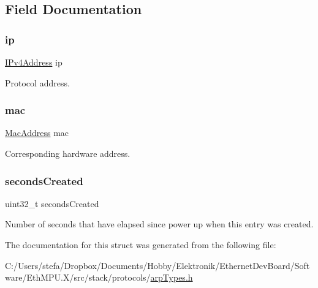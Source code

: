 \subsection{Field Documentation}
\mbox{\label{struct_a_r_p_table_entry__t_a9eb6364cfba6d26a96b3caa542fd9ed9}} 
\subsubsection{\texorpdfstring{ip}{ip}}
{\footnotesize\ttfamily \mbox{\hyperlink{group__ipv4_gaea6452a06c6a1edb025bdd2a70fef14c}{I\+Pv4\+Address}} ip}



Protocol address. 

\mbox{\label{struct_a_r_p_table_entry__t_a2d3bb97c3d100ba11c2257680d849879}} 
\subsubsection{\texorpdfstring{mac}{mac}}
{\footnotesize\ttfamily \mbox{\hyperlink{ethernet_types_8h_ae4e06476597d217d540a5e2b2d699649}{Mac\+Address}} mac}



Corresponding hardware address. 

\mbox{\label{struct_a_r_p_table_entry__t_a06c3d88e59b26905ae3d434ff0b6e23e}} 
\subsubsection{\texorpdfstring{secondsCreated}{secondsCreated}}
{\footnotesize\ttfamily uint32\+\_\+t seconds\+Created}



Number of seconds that have elapsed since power up when this entry was created. 



The documentation for this struct was generated from the following file\+:\begin{DoxyCompactItemize}
\item 
C\+:/\+Users/stefa/\+Dropbox/\+Documents/\+Hobby/\+Elektronik/\+Ethernet\+Dev\+Board/\+Software/\+Eth\+M\+P\+U.\+X/src/stack/protocols/\mbox{\hyperlink{arp_types_8h}{arp\+Types.\+h}}\end{DoxyCompactItemize}
